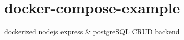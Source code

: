 \chapter{docker-\/compose-\/example}
\hypertarget{md__r_e_a_d_m_e}{}\label{md__r_e_a_d_m_e}
\label{md__r_e_a_d_m_e_autotoc_md2198}%
%


dockerized nodejs express \& postgre\+SQL CRUD backend 